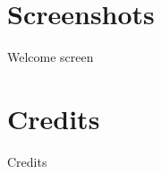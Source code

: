 \documentclass[12pt]{beamer}
\newcommand{\fitimageheight}[1]{\centering{\texttt{[image: \#1]}}}
\begin{document}
\section{Screenshots}
\begin{frame} 					\end{frame}
\begin{frame}{Welcome screen}	\fitimageheight{welcome.png}	\end{frame}

\section{Credits}
\begin{frame}{Credits}

\end{frame}

\appendix
\end{document}
